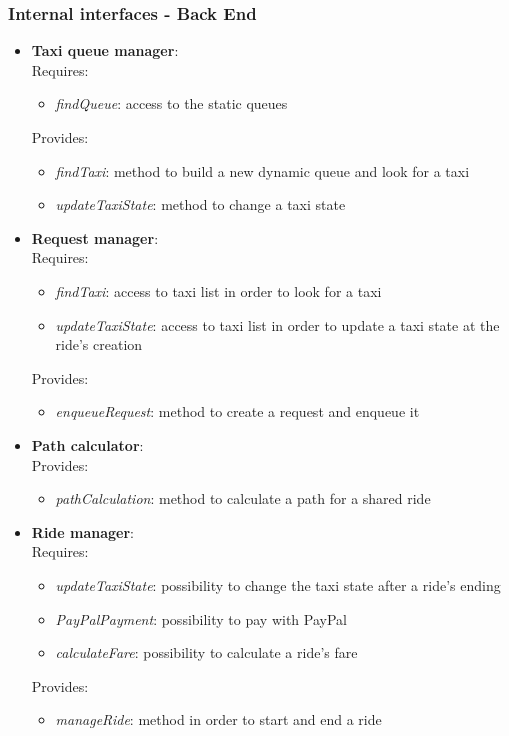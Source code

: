 \subsubsection{Internal interfaces - Back End}

\begin{itemize}
\item \textbf{Taxi queue manager}:\\
Requires:
\begin{itemize}
\item \textit{findQueue}: access to the static queues
\end{itemize}  
Provides:
\begin{itemize}
\item \textit{findTaxi}: method to build a new dynamic queue and look for a taxi
\item \textit{updateTaxiState}: method to change a taxi state
\end{itemize}
	
\item \textbf{Request manager}:\\
Requires:
\begin{itemize}
\item \textit{findTaxi}: access to taxi list in order to look for a taxi
\item \textit{updateTaxiState}: access to taxi list in order to update a taxi state at the ride's creation
\end{itemize}  
Provides:
\begin{itemize}
\item \textit{enqueueRequest}: method to create a request and enqueue it
\end{itemize}

\item \textbf{Path calculator}:\\
Provides:
\begin{itemize}
\item \textit{pathCalculation}: method to calculate a path for a shared ride 
\end{itemize}

\item \textbf{Ride manager}:\\
Requires:
\begin{itemize}
\item \textit{updateTaxiState}: possibility to change the taxi state after a ride's ending
\item \textit{PayPalPayment}: possibility to pay with PayPal
\item \textit{calculateFare}: possibility to calculate a ride's fare
\end{itemize} 
Provides:
\begin{itemize}
\item \textit{manageRide}: method in order to start and end a ride
\end{itemize}


\end{itemize}
